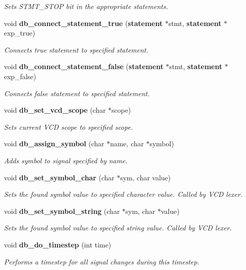\begin{CompactItemize}
\begin{CompactList}\small\item\em Sets STMT\_\-STOP bit in the appropriate statements.\item\end{CompactList}\item 
void {\bf db\_\-connect\_\-statement\_\-true} ({\bf statement} $\ast$stmt, {\bf statement} $\ast$exp\_\-true)
\begin{CompactList}\small\item\em Connects true statement to specified statement.\item\end{CompactList}\item 
void {\bf db\_\-connect\_\-statement\_\-false} ({\bf statement} $\ast$stmt, {\bf statement} $\ast$exp\_\-false)
\begin{CompactList}\small\item\em Connects false statement to specified statement.\item\end{CompactList}\item 
void {\bf db\_\-set\_\-vcd\_\-scope} (char $\ast$scope)
\begin{CompactList}\small\item\em Sets current VCD scope to specified scope.\item\end{CompactList}\item 
void {\bf db\_\-assign\_\-symbol} (char $\ast$name, char $\ast$symbol)
\begin{CompactList}\small\item\em Adds symbol to signal specified by name.\item\end{CompactList}\item 
void {\bf db\_\-set\_\-symbol\_\-char} (char $\ast$sym, char value)
\begin{CompactList}\small\item\em Sets the found symbol value to specified character value. Called by VCD lexer.\item\end{CompactList}\item 
void {\bf db\_\-set\_\-symbol\_\-string} (char $\ast$sym, char $\ast$value)
\begin{CompactList}\small\item\em Sets the found symbol value to specified string value. Called by VCD lexer.\item\end{CompactList}\item 
void {\bf db\_\-do\_\-timestep} (int time)
\begin{CompactList}\small\item\em Performs a timestep for all signal changes during this timestep.\item\end{CompactList}\end{CompactItemize}


